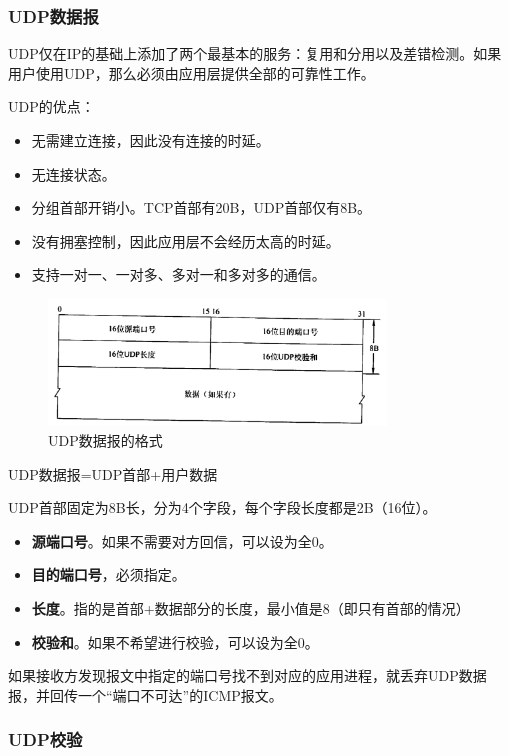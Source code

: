 \documentclass[12pt, a4paper, oneside]{ctexart}
\begin{document}
\subsubsection{UDP数据报}

UDP仅在IP的基础上添加了两个最基本的服务：复用和分用以及差错检测。如果用户使用UDP，那么必须由应用层提供全部的可靠性工作。

UDP的优点：
\begin{itemize}
    \item 无需建立连接，因此没有连接的时延。
    \item 无连接状态。
    \item 分组首部开销小。TCP首部有20B，UDP首部仅有8B。
    \item 没有拥塞控制，因此应用层不会经历太高的时延。
    \item 支持一对一、一对多、多对一和多对多的通信。
\end{itemize}

\begin{figure}[h]
    \centering
    \includegraphics[width=0.8\textwidth]{./images/udp_header.png}
    \caption{UDP数据报的格式}
\end{figure}

UDP数据报=UDP首部+用户数据

UDP首部固定为8B长，分为4个字段，每个字段长度都是2B（16位）。
\begin{itemize}
    \item {\bf 源端口号}。如果不需要对方回信，可以设为全0。
    \item {\bf 目的端口号}，必须指定。
    \item {\bf 长度}。指的是首部+数据部分的长度，最小值是8（即只有首部的情况）
    \item {\bf 校验和}。如果不希望进行校验，可以设为全0。
\end{itemize}

如果接收方发现报文中指定的端口号找不到对应的应用进程，就丢弃UDP数据报，并回传一个“端口不可达”的ICMP报文。

\subsubsection{UDP校验}
\end{document}
